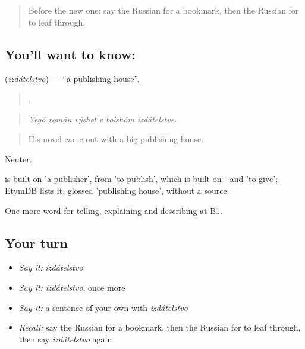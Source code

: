 \begin{quote}
Before the new one: say the Russian for a bookmark, then the Russian for to leaf through.
\end{quote}

\subsection*{You'll want to know: }
\textbf{} (\emph{izdátelstvo}) — \textquotedblleft{}a publishing house\textquotedblright{}.

\begin{quote}
     .
\end{quote}

\begin{quote}
\emph{Yegó román výshel v bolshóm izdátelstve.}
\end{quote}

\begin{quote}
His novel came out with a big publishing house.
\end{quote}

Neuter.

\begin{cousinweb}
\emph{} is built on \emph{} 'a publisher', from \emph{} 'to publish', which is built on \emph{-} and \emph{} 'to give'; EtymDB lists it, glossed 'publishing house', without a source.
\end{cousinweb}

\begin{grammarlens}[title={What you've built}]
One more word for telling, explaining and describing at B1.
\end{grammarlens}

\subsection*{Your turn}
\begin{itemize}
\raggedright
  \item \emph{Say it:} \emph{izdátelstvo}
  \item \emph{Say it:} \emph{izdátelstvo}, once more
  \item \emph{Say it:} a sentence of your own with \emph{izdátelstvo}
  \item \emph{Recall:} say the Russian for a bookmark, then the Russian for to leaf through, then say \emph{izdátelstvo} again
\end{itemize}

